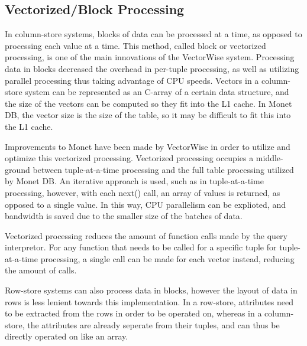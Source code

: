 \subsection*{Vectorized/Block Processing}


In column-store systems, blocks of data can be processed at a time, as opposed to processing each value at a time. This method, called block or vectorized processing, is one of the main innovations of the VectorWise system. Processing data in blocks decreased the overhead in per-tuple processing, as well as utilizing parallel processing thus taking advantage of CPU speeds\cite{colvsrow}. Vectors in a column-store system can be represented as an C-array of a certain data structure, and the size of the vectors can be computed so they fit into the L1 cache. In Monet DB, the vector size is the size of the table, so it may be difficult to fit this into the L1 cache\cite{now}. 


Improvements to Monet have been made by VectorWise in order to utilize and optimize this vectorized processing. Vectorized processing occupies a middle-ground between tuple-at-a-time processing and the full table processing utilized by Monet DB. An iterative approach is used, such as in tuple-at-a-time processing, however, with each next() call, an array of values is returned, as opposed to a single value\cite{colvsrow}. In this way, CPU parallelism can be explioted, and bandwidth is saved due to the smaller size of the batches of data.


Vectorized processing reduces the amount of function calls made by the query interpretor\cite{colvsrow}. For any function that needs to be called for a specific tuple for tuple-at-a-time processing, a single call can be made for each vector instead, reducing the amount of calls.


Row-store systems can also process data in blocks, however the layout of data in rows is less lenient towards this implementation. In a row-store, attributes need to be extracted from the rows in order to be operated on, whereas in a column-store, the attributes are already seperate from their tuples, and can thus be directly operated on like an array\cite{colvsrow}. 